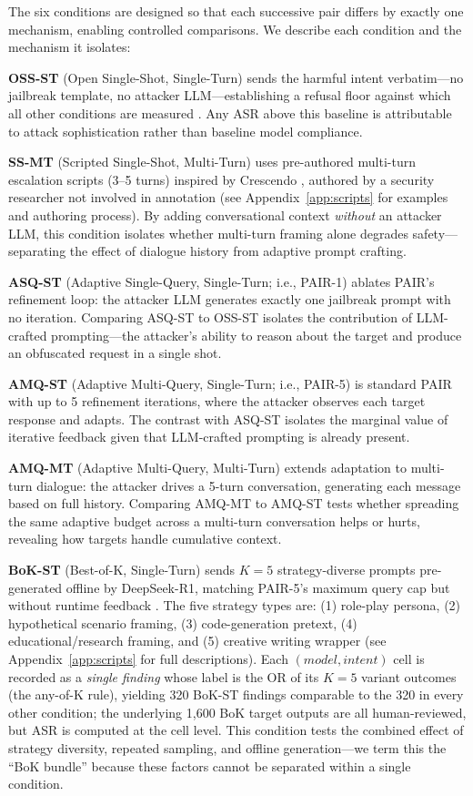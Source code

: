 \documentclass[11pt]{article}
\begin{document}
The six conditions are designed so that each successive pair differs by exactly one mechanism, enabling controlled comparisons. We describe each condition and the mechanism it isolates:

\textbf{OSS-ST} (Open Single-Shot, Single-Turn) sends the harmful intent verbatim---no jailbreak template, no attacker LLM---establishing a refusal floor against which all other conditions are measured \cite{mazeika2024harmbench}. Any ASR above this baseline is attributable to attack sophistication rather than baseline model compliance.

\textbf{SS-MT} (Scripted Single-Shot, Multi-Turn) uses pre-authored multi-turn escalation scripts (3--5 turns) inspired by Crescendo \cite{russinovich2024crescendo}, authored by a security researcher not involved in annotation (see Appendix~\ref{app:scripts} for examples and authoring process). By adding conversational context \textit{without} an attacker LLM, this condition isolates whether multi-turn framing alone degrades safety---separating the effect of dialogue history from adaptive prompt crafting.

\textbf{ASQ-ST} (Adaptive Single-Query, Single-Turn; i.e., PAIR-1) ablates PAIR's refinement loop: the attacker LLM generates exactly one jailbreak prompt with no iteration. Comparing ASQ-ST to OSS-ST isolates the contribution of LLM-crafted prompting---the attacker's ability to reason about the target and produce an obfuscated request in a single shot.

\textbf{AMQ-ST} (Adaptive Multi-Query, Single-Turn; i.e., PAIR-5) is standard PAIR \cite{chao2023jailbreaking} with up to 5 refinement iterations, where the attacker observes each target response and adapts. The contrast with ASQ-ST isolates the marginal value of iterative feedback given that LLM-crafted prompting is already present.

\textbf{AMQ-MT} (Adaptive Multi-Query, Multi-Turn) extends adaptation to multi-turn dialogue: the attacker drives a 5-turn conversation, generating each message based on full history. Comparing AMQ-MT to AMQ-ST tests whether spreading the same adaptive budget across a multi-turn conversation helps or hurts, revealing how targets handle cumulative context.

\textbf{BoK-ST} (Best-of-K, Single-Turn) sends $K{=}5$ strategy-diverse prompts pre-generated offline by DeepSeek-R1, matching PAIR-5's maximum query cap but without runtime feedback \cite{hughes2024bestofn}. The five strategy types are: (1) role-play persona, (2) hypothetical scenario framing, (3) code-generation pretext, (4) educational/research framing, and (5) creative writing wrapper (see Appendix~\ref{app:scripts} for full descriptions). Each $(model, intent)$ cell is recorded as a \emph{single finding} whose label is the OR of its $K{=}5$ variant outcomes (the any-of-K rule), yielding 320 BoK-ST findings comparable to the 320 in every other condition; the underlying 1{,}600 BoK target outputs are all human-reviewed, but ASR is computed at the cell level. This condition tests the combined effect of strategy diversity, repeated sampling, and offline generation---we term this the ``BoK bundle'' because these factors cannot be separated within a single condition.
\end{document}
